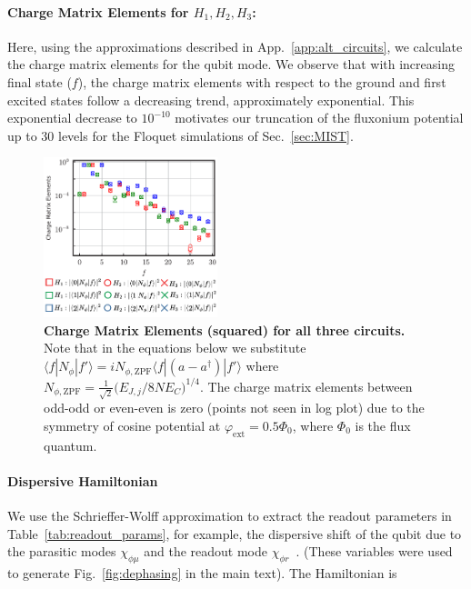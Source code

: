 \documentclass[%
reprint,
superscriptaddress,
 amsmath,amssymb,
 aps,
 prx,
longbibliography,
floatfix,
]{revtex4-2}
\begin{document}
\paragraph{Charge Matrix Elements for $H_1,H_2,H_3$:}
Here, using the approximations described in App.~\ref{app:alt_circuits}, we calculate the charge matrix elements for the qubit mode. We observe that with increasing final state ($f$), the charge matrix elements with respect to the ground and first excited states follow a decreasing trend, approximately exponential. This exponential decrease to $10^{-10}$ motivates our truncation of the fluxonium potential up to $30$ levels for the Floquet simulations of Sec.~\ref{sec:MIST}.
\begin{figure}[hbt]
    \centering
\includegraphics[width=0.45\textwidth]{Supp_Fig/Charge_Matrix.pdf}
    \caption{{\bf Charge Matrix 
 Elements (squared) for all three circuits.} Note that in the equations below we substitute $\langle f|N_\phi|f'\rangle=iN_{\phi,\mathrm{ZPF}}\langle f|(a-a^\dagger)|f'\rangle$ where $N_{\phi,\mathrm{ZPF}}=\frac{1}{\sqrt{2}}\Big(E_{J,j}/8NE_C\Big)^{1/4}$. The charge matrix elements between odd-odd or even-even is zero (points not seen in log plot) due to the symmetry of cosine potential at $\varphi_\mathrm{ext}=0.5\Phi_0$, where $\Phi_0$ is the flux quantum.}
    \label{charge-matrix}
\end{figure}


\paragraph{Dispersive Hamiltonian}\label{app:dispersive}
We use the Schrieffer-Wolff approximation to extract the readout parameters in Table~\ref{tab:readout_params}, for example, the dispersive shift of the qubit due to the parasitic modes $\chi_{\phi\mu}$ and the readout mode $\chi_{\phi r}$~\cite{viola2015collective}. (These variables were used to generate Fig.~\ref{fig:dephasing} in the main text). The Hamiltonian is 
\end{document}
